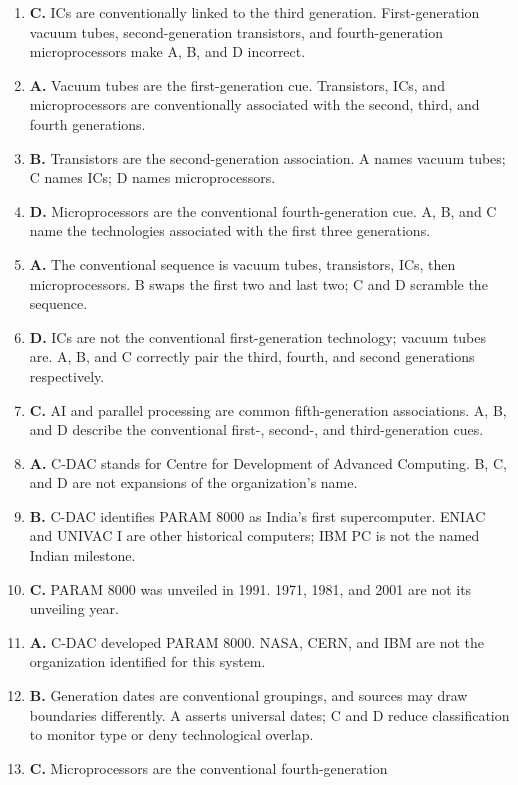 \begin{enumerate}[label=\textbf{Q\arabic*.}, leftmargin=*]
\item \textbf{C.} ICs are conventionally linked to the third generation.
  First-generation vacuum tubes, second-generation transistors, and
  fourth-generation microprocessors make A, B, and D incorrect.
\item \textbf{A.} Vacuum tubes are the first-generation cue. Transistors,
  ICs, and microprocessors are conventionally associated with the second,
  third, and fourth generations.
\item \textbf{B.} Transistors are the second-generation association. A names
  vacuum tubes; C names ICs; D names microprocessors.
\item \textbf{D.} Microprocessors are the conventional fourth-generation
  cue. A, B, and C name the technologies associated with the first three
  generations.
\item \textbf{A.} The conventional sequence is vacuum tubes, transistors,
  ICs, then microprocessors. B swaps the first two and last two; C and D
  scramble the sequence.
\item \textbf{D.} ICs are not the conventional first-generation technology;
  vacuum tubes are. A, B, and C correctly pair the third, fourth, and second
  generations respectively.
\item \textbf{C.} AI and parallel processing are common fifth-generation
  associations. A, B, and D describe the conventional first-, second-, and
  third-generation cues.
\item \textbf{A.} C-DAC stands for Centre for Development of Advanced
  Computing. B, C, and D are not expansions of the organization's name.
\item \textbf{B.} C-DAC identifies PARAM 8000 as India's first
  supercomputer. ENIAC and UNIVAC I are other historical computers; IBM PC
  is not the named Indian milestone.
\item \textbf{C.} PARAM 8000 was unveiled in 1991. 1971, 1981, and 2001 are
  not its unveiling year.
\item \textbf{A.} C-DAC developed PARAM 8000. NASA, CERN, and IBM are not the
  organization identified for this system.
\item \textbf{B.} Generation dates are conventional groupings, and sources
  may draw boundaries differently. A asserts universal dates; C and D
  reduce classification to monitor type or deny technological overlap.
\item \textbf{C.} Microprocessors are the conventional fourth-generation

\end{enumerate}

